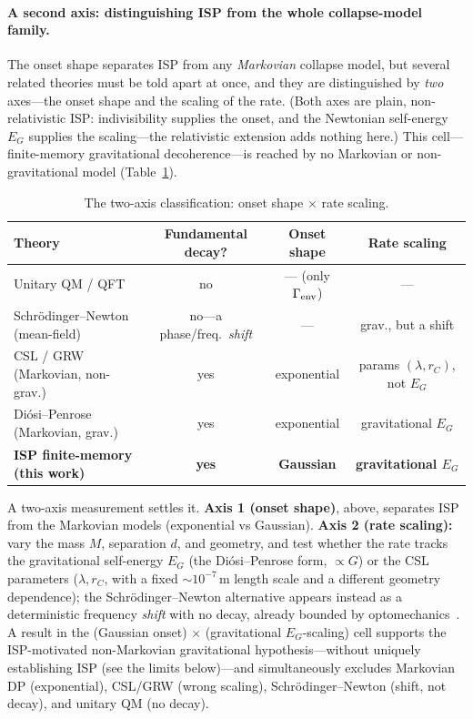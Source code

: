 \documentclass[aps,prd,onecolumn,amsmath,amssymb,nofootinbib,superscriptaddress]{revtex4-2}
\begin{document}
\paragraph{A second axis: distinguishing ISP from the whole collapse-model family.} The onset shape
separates ISP from any \emph{Markovian} collapse model, but several related theories must be told
apart at once, and they are distinguished by \emph{two} axes---the onset shape and the scaling of the
rate. (Both axes are plain, non-relativistic ISP: indivisibility supplies the onset, and the
Newtonian self-energy $E_G$ supplies the scaling---the relativistic extension adds nothing here.)
This cell---finite-memory gravitational decoherence---is reached by no Markovian or non-gravitational
model (Table~\ref{tab:twoaxis}).

\begin{table}[h]
\centering
\caption{The two-axis classification: onset shape $\times$ rate scaling.}\label{tab:twoaxis}
\begin{tabular}{lccc}
\hline\hline
Theory & Fundamental decay? & Onset shape & Rate scaling \\
\hline
Unitary QM / QFT & no & --- (only $\Gamma_{\rm env}$) & --- \\
Schr\"odinger--Newton (mean-field)~\cite{R24} & no---a phase/freq.\ \emph{shift} & --- & grav., but a shift \\
CSL / GRW (Markovian, non-grav.)~\cite{R4,R5} & yes & exponential & params $(\lambda,r_C)$, not $E_G$ \\
Di\'osi--Penrose (Markovian, grav.)~\cite{R1,R2} & yes & exponential & gravitational $E_G$ \\
\textbf{ISP finite-memory (this work)} & \textbf{yes} & \textbf{Gaussian} & \textbf{gravitational $E_G$} \\
\hline\hline
\end{tabular}
\end{table}

A two-axis measurement settles it. \textbf{Axis 1 (onset shape)}, above, separates ISP from the
Markovian models (exponential vs Gaussian). \textbf{Axis 2 (rate scaling):} vary the mass $M$,
separation $d$, and geometry, and test whether the rate tracks the gravitational self-energy $E_G$
(the Di\'osi--Penrose form, $\propto G$) or the CSL parameters ($\lambda,r_C$, with a fixed
$\sim10^{-7}\,$m length scale and a different geometry dependence); the Schr\"odinger--Newton
alternative appears instead as a deterministic frequency \emph{shift} with no decay, already bounded
by optomechanics~\cite{R24}. A result in the (Gaussian onset) $\times$ (gravitational
$E_G$-scaling) cell supports the ISP-motivated non-Markovian gravitational hypothesis---without
uniquely establishing ISP (see the limits below)---and simultaneously excludes Markovian DP
(exponential), CSL/GRW (wrong scaling), Schr\"odinger--Newton (shift, not decay), and unitary QM (no
decay).
\end{document}
